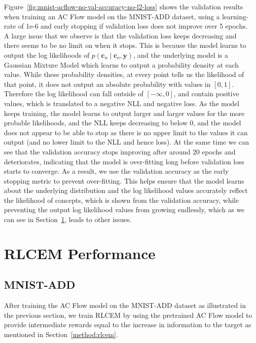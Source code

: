 Figure~\ref{fig:mnist-acflow-no-val-accuracy-no-l2-loss} shows the 
validation results when training an AC Flow model
on the MNIST-ADD dataset, using a learning-rate of 1e-6 and 
early stopping if validation loss does not improve over 5 epochs.
A large issue that we observe is that the validation loss
keeps decreasing and there seems to be no limit on when it stops.
This is because the model learns to output the log likelihoods 
of $p(\mathbf{c}_u \mid \mathbf{c}_o, \mathbf{y})$, and the underlying
model is a Gaussian Mixture Model which learns to output
a probability density at each value. While these probability densities,
at every point tells us the likelihood of that point,
it does not output an absolute probability with values in $[0,1]$. Therefore
the log likelihood can fall outside of $[-\infty, 0]$, and contain 
positive values, which is translated to a negative NLL and negative loss.
As the model keeps training, the model learns to output larger and larger
values for the more probable likelihoods, and the NLL keeps decreasing
to below 0, and the model does not appear to be able to stop as there is no
upper limit to the values it can output (and no lower limit to the NLL and hence
loss). At the same time we can see that the validation accuracy stops improving
after around 20 epochs and deteriorates, indicating that the model is over-fitting
long before validation loss starts to converge.
As a result, we use the validation accuracy as the early stopping
metric to prevent over-fitting. This helps ensure that 
the model learns about the underlying distribution and 
the log likelihood values accurately reflect the likelihood 
of concepts, which is 
shown from the validation accuracy, while preventing 
the output log likelihood values from growing endlessly, which
as we can see in Section~\ref{eval:rlcem-performance}, 
leads to other issues.

\section{RLCEM Performance}\label{eval:rlcem-performance}

\subsection{MNIST-ADD}

After training the AC Flow model on the MNIST-ADD dataset 
as illustrated in the previous section, we train RLCEM by 
using the
pretrained AC Flow model to provide intermediate rewards equal to 
the increase in information to the target as mentioned in 
Section~\ref{method:rlcem}.

